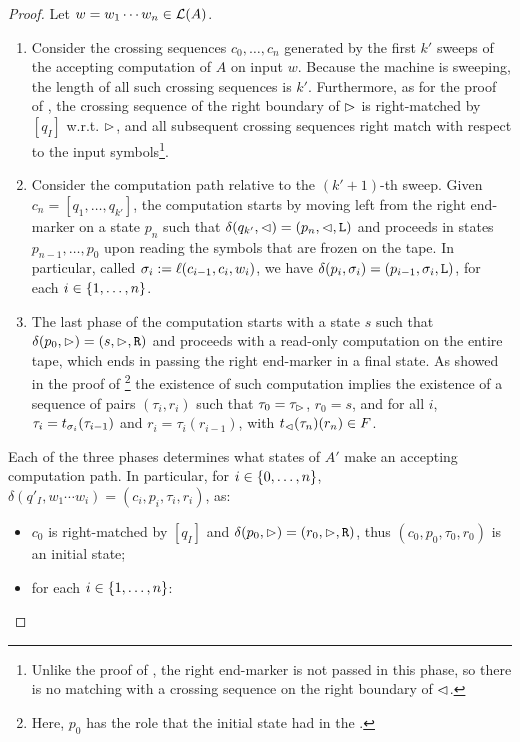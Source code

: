 \begin{proof}
	Let $w=w_1\cdots w_n\in\mathcal L(A)$.
	\begin{enumerate}
		\item Consider the crossing sequences $c_0,\dots,c_n$ generated by the first $k'$ sweeps of the accepting computation of $A$ on input $w$.
		      Because the machine is sweeping, the length of all such crossing sequences is $k'$.
		      Furthermore, as for the proof of , the crossing sequence of the right boundary of $\rhd$ is right-matched by $[q_I]$ w.r.t. $\rhd$, and all subsequent crossing sequences right match with respect to the input symbols\footnote{%
			      Unlike the proof of , the right end-marker is not passed in this phase, so there is no matching with a crossing sequence on the right boundary of $\lhd$.}.
		\item Consider the computation path relative to the $(k'+1)$-th sweep.
		      Given $c_n=[q_1,\dots,q_{k'}]$, the computation starts by moving left from the right end-marker on a state $p_n$ such that $\delta(q_{k'},\lhd)=(p_n,\lhd,\mathtt L)$ and proceeds in states $p_{n-1},\dots,p_0$ upon reading the symbols that are frozen on the tape.
		      In particular, called $\sigma_i:=\ell(c_{i-1},c_i,w_i)$, we have $\delta(p_i,\sigma_i)=(p_{i-1},\sigma_i,\mathtt L)$, for each $i\in\{1,\dots,n\}$.
		\item The last phase of the computation starts with a state $s$ such that $\delta(p_0,\rhd)=(s,\rhd,\mathtt R)$ and proceeds with a read-only computation on the entire tape, which ends in passing the right end-marker in a final state.
		      As showed in the proof of \footnote{%
			      Here, $p_0$ has the role that the initial state had in the \TDFA.}
		      the existence of such computation implies the existence of a sequence of pairs $(\tau_i,r_i)$ such that $\tau_0=\tau_\rhd$, $r_0=s$, and for all $i$, $\tau_i=t_{\sigma_i}(\tau_{i-1})$ and $r_i=\tau_i(r_{i-1})$, with $t_\lhd(\tau_n)(r_n)\in F$.
	\end{enumerate}
	Each of the three phases determines what states of $A'$ make an accepting computation path. In particular, for $i\in\{0,\dots,n\}$, $\delta(q'_I,w_1\cdots w_i)=(c_i,p_i,\tau_i,r_i)$, as:
	\begin{itemize}
		\item $c_0$ is right-matched by $[q_I]$ and $\delta(p_0,\rhd)=(r_0,\rhd,\mathtt R)$, thus $(c_0,p_0,\tau_0,r_0)$ is an initial state;
		\item for each $i\in\{1,\dots,n\}$:
		      \begin{itemize}

\end{itemize}
\end{itemize}
\end{proof}
